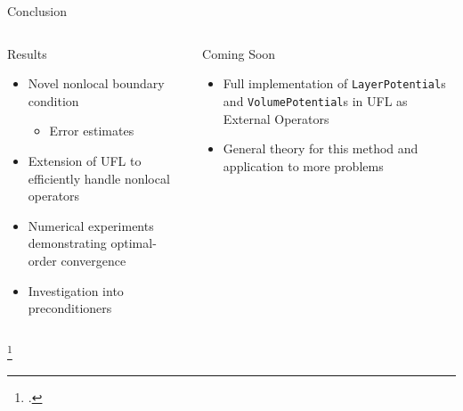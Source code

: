 \documentclass{beamer}
\begin{document}
\begin{frame}{Conclusion}
    \begin{columns}
        \begin{column}{0.55\textwidth}
        \begin{block}{Results}
            \begin{itemize}
                \item Novel nonlocal boundary condition
                \begin{itemize}
                    \item Error estimates
                    \footnotemark
                \end{itemize}
                \item Extension of UFL to efficiently handle nonlocal operators
                \item Numerical experiments demonstrating optimal-order convergence
                \item Investigation into preconditioners
            \end{itemize}
        \end{block}
        \end{column}
        \begin{column}{0.45\textwidth}
        \begin{block}{Coming Soon}
            \begin{itemize}
                \item Full implementation of \texttt{LayerPotential}s
                and \texttt{VolumePotential}\footnotemark s in UFL as External Operator\footnotemark s
                
                \item General theory for this method and application to more problems
            \end{itemize}
        \end{block}
        \end{column}
    \end{columns}
    \vfill
    \addtocounter{footnote}{-1}
    \footcitetext{kirby2021finite}
\end{frame}
\end{document}
